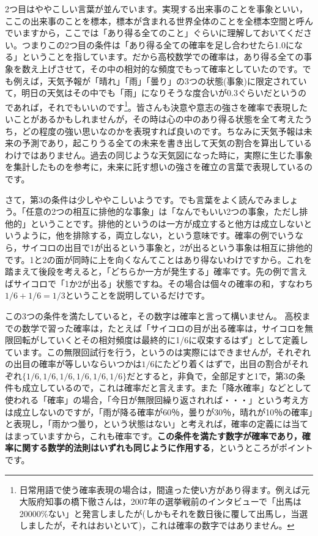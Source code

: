 \documentclass{ltjbook}
\begin{document}
2つ目はややこしい言葉が並んでいます。実現する出来事のことを事象といい，ここの出来事のことを標本，標本が含まれる世界全体のことを全標本空間と呼んでいますから，ここでは「あり得る全てのこと」ぐらいに理解しておいてください。つまりこの2つ目の条件は「あり得る全ての確率を足し合わせたら1.0になる」ということを指しています。だから高校数学での確率は，あり得る全ての事象を数え上げさせて，その中の相対的な頻度でもって確率としていたのです。でも例えば，天気予報が「晴れ」「雨」「曇り」の3つの状態(事象)に限定されていて，明日の天気はその中でも「雨」になりそうな度合いが0.3ぐらいだというのであれば，それでもいいのです\footnote{日常用語で使う確率表現の場合は，間違った使い方があり得ます。例えば元大阪府知事の橋下徹さんは，2007年の選挙戦前のインタビューで「出馬は20000\%ない」と発言しましたが(しかもそれを数日後に覆して出馬し，当選しましたが，それはおいといて)，これは確率の数字ではありません。}。皆さんも決意や意志の強さを確率で表現したいことがあるかもしれませんが，その時は心の中のあり得る状態を全て考えたうち，どの程度の強い思いなのかを表現すれば良いのです。ちなみに天気予報は未来の予測であり，起こりうる全ての未来を書き出して天気の割合を算出しているわけではありません。過去の同じような天気図になった時に，実際に生じた事象を集計したものを参考に，未来に託す想いの強さを確立の言葉で表現しているのです。

さて，第3の条件は少しややこしいようです。でも言葉をよく読んでみましょう。「任意の2つの相互に排他的な事象」は「なんでもいい2つの事象，ただし排他的」ということです。排他的というのは一方が成立すると他方は成立しないというように，他を排除する，両立しない，という意味です。確率の例でいうなら，サイコロの出目で1が出るという事象と，2が出るという事象は相互に排他的です。1と2の面が同時に上を向くなんてことはあり得ないわけですから。これを踏まえて後段を考えると，「どちらか一方が発生する」確率です。先の例で言えばサイコロで「1か2が出る」状態ですね。その場合は個々の確率の和，すなわち$1/6+1/6=1/3$ということを説明しているだけです。

この3つの条件を満たしていると，その数字は確率と言って構いません。
高校までの数学で習った確率は，たとえば「サイコロの目が出る確率は，サイコロを無限回転がしていくとその相対頻度は最終的に1/6に収束するはず」として定義しています。この無限回試行を行う，というのは実際にはできませんが，それぞれの出目の確率が等しいならいつかは$1/6$にたどり着くはずで，出目の割合がそれぞれ$\{ 1/6,1/6,1/6,1/6,1/6,1/6 \}$だとすると，非負で，全部足すと1で，第3の条件も成立しているので，これは確率だと言えます。また「降水確率」などとして使われる「確率」の場合，「今日が無限回繰り返されれば・・・」という考え方は成立しないのですが，「雨が降る確率が60％，曇りが30％，晴れが10％の確率」と表現し，「雨かつ曇り，という状態はない」と考えれば，確率の定義には当てはまっていますから，これも確率です。\textbf{この条件を満たす数字が確率であり，確率に関する数学的法則はいずれも同じように作用する}，というところがポイントです。
\end{document}
